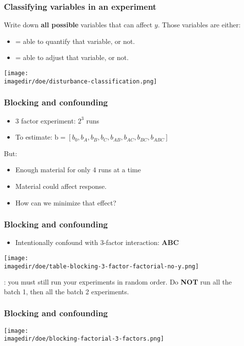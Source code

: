 \begin{frame}\frametitle{Classifying variables in an experiment}
	Write down \textbf{all possible} variables that can affect $y$. Those variables are either:
	\begin{itemize}
		\item	{\color{purple}{Measurable}} = able to quantify that variable, or not.
		\item	{\color{purple}{Controllable}} = able to adjust that variable, or not.
	\end{itemize}
	\begin{center}
		\texttt{[image: \\imagedir/doe/disturbance-classification.png]}
	\end{center}
\end{frame}

\begin{frame}\frametitle{Blocking and confounding}
	\begin{itemize}
		\item	3 factor experiment: $2^3$ runs
		\item	To estimate: $\mathrm{b} = [b_0, b_A, b_B, b_C, b_{AB}, b_{AC}, b_{BC}, b_{ABC}]$
	\end{itemize}

	But:
	\begin{itemize}
		\item	Enough material for only 4 runs at a time
		\item	Material could affect response.
		\item	How can we minimize that effect?
	\end{itemize}
\end{frame}

\begin{frame}\frametitle{Blocking and confounding}
	\begin{itemize}
		\item	Intentionally confound with 3-factor interaction: \textbf{ABC}
	\end{itemize}
	\begin{center}
		\texttt{[image: \\imagedir/doe/table-blocking-3-factor-factorial-no-y.png]}
	\end{center}
	\vspace{12pt}
	{\color{myOrange}{Important note}}: you must still run your experiments in random order. Do \textbf{NOT} run all the batch 1, then all the batch 2 experiments.
\end{frame}

\begin{frame}\frametitle{Blocking and confounding}
	\begin{center}
		\texttt{[image: \\imagedir/doe/blocking-factorial-3-factors.png]}
	\end{center}
\end{frame}

